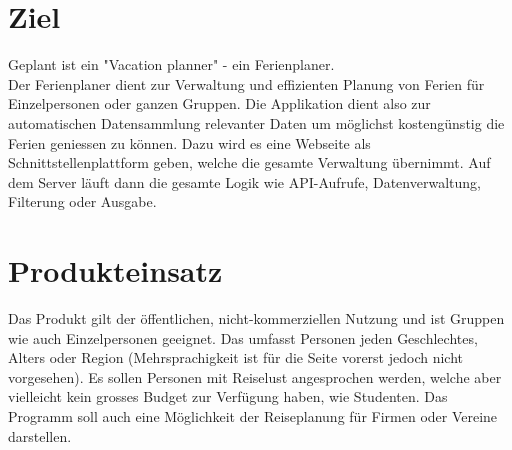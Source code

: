\documentclass[10pt,a4paper,titlepage,twoside,german]{zhawreprt}
\begin{document}
\maketitle

\tableofcontents

\chapter{Ziel}\label{chp:Objective}
Geplant ist ein "Vacation planner" - ein Ferienplaner.\\
Der Ferienplaner dient zur Verwaltung und effizienten Planung von Ferien für Einzelpersonen oder ganzen Gruppen. Die Applikation dient also zur automatischen Datensammlung relevanter Daten um möglichst kostengünstig die Ferien geniessen zu können. Dazu wird es eine Webseite als Schnittstellenplattform geben, welche die gesamte Verwaltung übernimmt. Auf dem Server läuft dann die gesamte Logik wie API-Aufrufe, Datenverwaltung, Filterung oder Ausgabe.
\chapter{Produkteinsatz}\label{chp:FieldOfApplience}
Das Produkt gilt der öffentlichen, nicht-kommerziellen Nutzung und ist Gruppen wie auch Einzelpersonen geeignet. Das umfasst Personen jeden Geschlechtes, Alters oder Region (Mehrsprachigkeit ist für die Seite vorerst jedoch nicht vorgesehen). Es sollen Personen mit Reiselust angesprochen werden, welche aber vielleicht kein grosses Budget zur Verfügung haben, wie Studenten. Das Programm soll auch eine Möglichkeit der Reiseplanung für Firmen oder Vereine darstellen.
\end{document}
